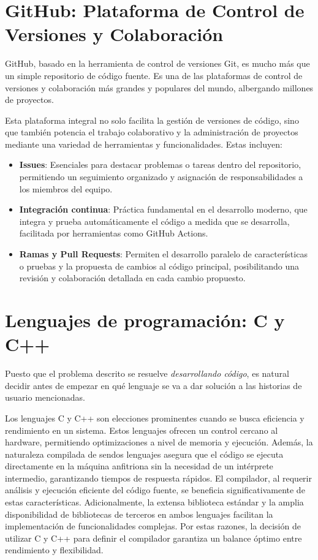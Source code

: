 \section{GitHub: Plataforma de Control de Versiones y Colaboración}
GitHub, basado en la herramienta de control de versiones Git, es mucho más que un simple repositorio de código fuente. Es una de las plataformas de control de versiones y colaboración más grandes y populares del mundo, albergando millones de proyectos.

Esta plataforma integral no solo facilita la gestión de versiones de código, sino que también potencia el trabajo colaborativo y la administración de proyectos mediante una variedad de herramientas y funcionalidades. Estas incluyen:

\begin{itemize}
    \item \textbf{Issues}: Esenciales para destacar problemas o tareas dentro del repositorio, permitiendo un seguimiento organizado y asignación de responsabilidades a los miembros del equipo.
    \item \textbf{Integración continua}: Práctica fundamental en el desarrollo moderno, que integra y prueba automáticamente el código a medida que se desarrolla, facilitada por herramientas como GitHub Actions.
    \item \textbf{Ramas y Pull Requests}: Permiten el desarrollo paralelo de características o pruebas y la propuesta de cambios al código principal, posibilitando una revisión y colaboración detallada en cada cambio propuesto.
\end{itemize}

\section{Lenguajes de programación: C y C++}
Puesto que el problema descrito se resuelve \textit{desarrollando código}, es natural decidir antes de empezar en qué lenguaje se va a dar solución a las historias de usuario mencionadas.


Los lenguajes C y C++ son elecciones prominentes cuando se busca eficiencia y rendimiento en un sistema. Estos lenguajes ofrecen un control cercano al hardware, permitiendo optimizaciones a nivel de memoria y ejecución. Además, la naturaleza compilada de sendos lenguajes asegura que el código se ejecuta directamente en la máquina anfitriona sin la necesidad de un intérprete intermedio, garantizando tiempos de respuesta rápidos. El compilador, al requerir análisis y ejecución eficiente del código fuente, se beneficia significativamente de estas características. Adicionalmente, la extensa biblioteca estándar y la amplia disponibilidad de bibliotecas de terceros en ambos lenguajes facilitan la implementación de funcionalidades complejas. Por estas razones, la decisión de utilizar C y C++ para definir el compilador garantiza un balance óptimo entre rendimiento y flexibilidad.

